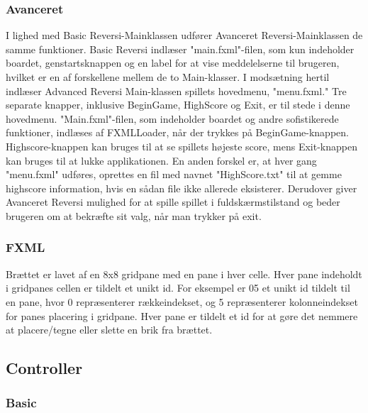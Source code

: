 \subsubsection{Avanceret} \label{am}
I lighed med Basic Reversi-Mainklassen udfører Avanceret Reversi-Mainklassen de samme funktioner. Basic Reversi indlæser "main.fxml"-filen, som kun indeholder boardet, genstartsknappen og en label for at vise meddelelserne til brugeren, hvilket er en af forskellene mellem de to Main-klasser. I modsætning hertil indlæser Advanced Reversi Main-klassen spillets hovedmenu, "menu.fxml." Tre separate knapper, inklusive BeginGame, HighScore og Exit, er til stede i denne hovedmenu. "Main.fxml"-filen, som indeholder boardet og andre sofistikerede funktioner, indlæses af FXMLLoader, når der trykkes på BeginGame-knappen. Highscore-knappen kan bruges til at se spillets højeste score, mens Exit-knappen kan bruges til at lukke applikationen. En anden forskel er, at hver gang "menu.fxml" udføres, oprettes en fil med navnet "HighScore.txt" til at gemme  highscore information, hvis en sådan file ikke allerede eksisterer. Derudover giver Avanceret Reversi mulighed for at spille spillet i fuldskærmstilstand og beder brugeren om at bekræfte sit valg, når man trykker på exit.

\subsubsection{FXML}\label{BD}
Brættet er lavet af en 8x8 gridpane med en pane i hver celle. Hver pane indeholdt i gridpanes cellen er tildelt et unikt id. For eksempel er 05 et unikt id tildelt til en pane, hvor 0 repræsenterer rækkeindekset, og 5 repræsenterer kolonneindekset for panes placering i gridpane. Hver pane er tildelt et id for at gøre det nemmere at placere/tegne eller slette en brik fra brættet.


\subsection{Controller}

\subsubsection{Basic}


